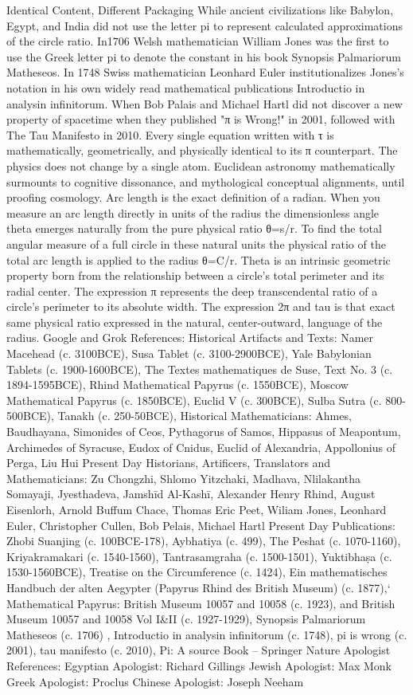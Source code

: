 Identical Content, Different Packaging
While ancient civilizations like Babylon, Egypt, and India did not use the letter pi to represent calculated approximations of the circle ratio. In1706 Welsh mathematician William Jones was the first to use the Greek letter pi to denote the constant in his book Synopsis Palmariorum Matheseos. In 1748 Swiss mathematician Leonhard Euler institutionalizes Jones’s notation in his own widely read mathematical publications Introductio in analysin infinitorum. When Bob Palais and Michael Hartl did not discover a new property of spacetime when they published "π is Wrong!" in 2001, followed with The Tau Manifesto in 2010. Every single equation written with τ is mathematically, geometrically, and physically identical to its π counterpart. The physics does not change by a single atom. Euclidean astronomy mathematically surmounts to cognitive dissonance, and mythological conceptual alignments, until proofing cosmology. Arc length is the exact definition of a radian. When you measure an arc length directly in units of the radius the dimensionless angle theta emerges naturally from the pure physical ratio θ={s}/{r}. To find the total angular measure of a full circle in these natural units the physical ratio of the total arc length is applied to the radius θ={C}/{r}. Theta is an intrinsic geometric property born from the relationship between a circle’s total perimeter and its radial center. The expression π represents the deep transcendental ratio of a circle's perimeter to its absolute width. The expression 2π and tau is that exact same physical ratio expressed in the natural, center-outward, language of the radius. 
Google and Grok References: 
Historical Artifacts and Texts: Namer Macehead (c. 3100BCE), Susa Tablet (c. 3100-2900BCE), Yale Babylonian Tablets (c. 1900-1600BCE), The Textes mathematiques de Suse, Text No. 3 (c. 1894-1595BCE), Rhind Mathematical Papyrus (c. 1550BCE), Moscow Mathematical Papyrus (c. 1850BCE), Euclid V (c. 300BCE), Sulba Sutra (c. 800-500BCE), Tanakh (c. 250-50BCE),
Historical Mathematicians: Ahmes, Baudhayana, Simonides of Ceos, Pythagorus of Samos, Hippasus of Meapontum, Archimedes of Syracuse, Eudox of Cnidus, Euclid of Alexandria, Appollonius of Perga, Liu Hui
Present Day Historians, Artificers, Translators and Mathematicians: Zu Chongzhi, Shlomo Yitzchaki, Madhava, Nlilakantha Somayaji, Jyesthadeva, Jamshīd Al-Kashī, Alexander Henry Rhind, August Eisenlorh, Arnold Buffum Chace, Thomas Eric Peet, Wiliam Jones, Leonhard Euler, Christopher Cullen, Bob Pelais, Michael Hartl
Present Day Publications: Zhobi Suanjing (c. 100BCE-178), Aybhatiya (c. 499), The Peshat (c. 1070-1160), Kriyakramakari (c. 1540-1560), Tantrasamgraha (c. 1500-1501), Yuktibhaṣa (c. 1530-1560BCE), Treatise on the Circumference (c. 1424), Ein mathematisches Handbuch der alten Aegypter (Papyrus Rhind des British Museum) (c. 1877),` Mathematical Papyrus: British Museum 10057 and 10058 (c. 1923), and British Museum 10057 and 10058 Vol I&II (c. 1927-1929), Synopsis Palmariorum Matheseos (c. 1706) , Introductio in analysin infinitorum (c. 1748), pi is wrong (c. 2001), tau manifesto (c. 2010), Pi: A source Book – Springer Nature
Apologist References: 
Egyptian Apologist: Richard Gillings
Jewish Apologist: Max Monk 
Greek Apologist: Proclus
Chinese Apologist: Joseph Neeham


